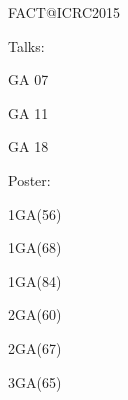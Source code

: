 \documentclass[t]{beamer}
\begin{document}
\begin{columns}[t, onlytextwidth]
\begin{column}{0.16\textwidth}
    \begin{block}[equal height group=bottom]{\normalsize FACT@ICRC2015}
      \begin{multicols}{2}
        \noindent Talks:
        \begin{description}[align=right, labelwidth=1.70cm, nosep]
          \item[806] GA 07
          \item[1032] GA 11
          \item[704] GA 18 
        \end{description}
        \noindent Poster:
        \begin{description}[align=right, labelwidth=1.3cm, nosep]
          \item[706] 1GA(56)
          \item[123] 1GA(68)
          \item[976] 1GA(84)
          \item[733] 2GA(60)
          \item[707] 2GA(67)
          \item[123] 3GA(65)
        \end{description}
      \end{multicols}
    \end{block}
  \end{column}%
\end{columns}%
\end{document}
